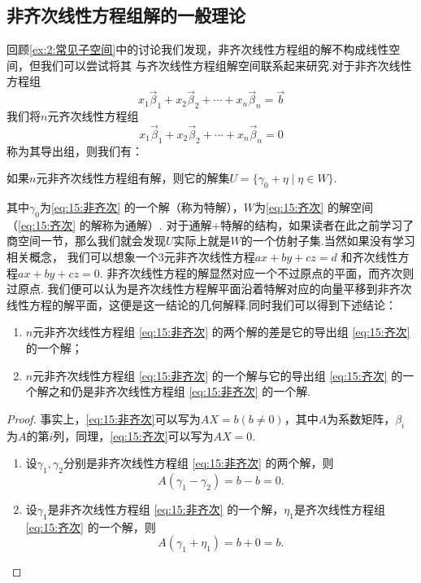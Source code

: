 \subsection{非齐次线性方程组解的一般理论}
回顾\autoref{ex:2:常见子空间}中的讨论我们发现，非齐次线性方程组的解不构成线性空间，但我们可以尝试将其
与齐次线性方程组解空间联系起来研究.对于非齐次线性方程组
\begin{equation} \label{eq:15:非齐次}
    x_1\vec{\beta}_1+x_2\vec{\beta}_2+\cdots+x_n\vec{\beta}_n=\vec{b}
\end{equation}
我们将$n$元齐次线性方程组
\begin{equation} \label{eq:15:齐次}
    x_1\vec{\beta}_1+x_2\vec{\beta}_2+\cdots+x_n\vec{\beta}_n=0
\end{equation}
称为其导出组，则我们有：
\begin{theorem}
    如果$n$元非齐次线性方程组有解，则它的解集$U=\{\gamma_0+\eta \mid \eta \in W\}$.
\end{theorem}
其中$\gamma_0$为\autoref{eq:15:非齐次} 的一个解（称为特解），$W$为\autoref{eq:15:齐次} 的解空间（\autoref*{eq:15:齐次} 的解称为通解）.
对于通解+特解的结构，如果读者在此之前学习了商空间一节，那么我们就会发现$U$实际上就是$W$的一个仿射子集.当然如果没有学习相关概念，
我们可以想象一个3元非齐次线性方程$ax + by + cz = d$ 和齐次线性方程$ax + by + cz = 0$.
非齐次线性方程的解显然对应一个不过原点的平面，而齐次则过原点.
我们便可以认为是齐次线性方程解平面沿着特解对应的向量平移到非齐次线性方程的解平面，这便是这一结论的几何解释.同时我们可以得到下述结论：
\begin{enumerate}
    \item $n$元非齐次线性方程组 \ref*{eq:15:非齐次} 的两个解的差是它的导出组 \ref*{eq:15:齐次} 的一个解；
    \item $n$元非齐次线性方程组 \ref*{eq:15:非齐次} 的一个解与它的导出组 \ref*{eq:15:齐次} 的一个解之和仍是非齐次线性方程组 \ref*{eq:15:非齐次} 的一个解.
\end{enumerate}
\begin{proof}
    事实上，\ref*{eq:15:非齐次}可以写为$AX=b(b\neq 0)$，其中$A$为系数矩阵，$\beta_i$为$A$的第$i$列，同理，\ref*{eq:15:齐次}可以写为$AX=0$.
    \begin{enumerate}
        \item 设$\gamma_1,\gamma_2$分别是非齐次线性方程组 \ref*{eq:15:非齐次} 的两个解，则
        \[A(\gamma_1-\gamma_2)=b-b=0.\]
        \item 设$\gamma_1$是非齐次线性方程组 \ref*{eq:15:非齐次} 的一个解，$\eta_1$是齐次线性方程组 \ref*{eq:15:齐次} 的一个解，则
        \[A(\gamma_1+\eta_1)=b+0=b.\]
    \end{enumerate}
\end{proof}
